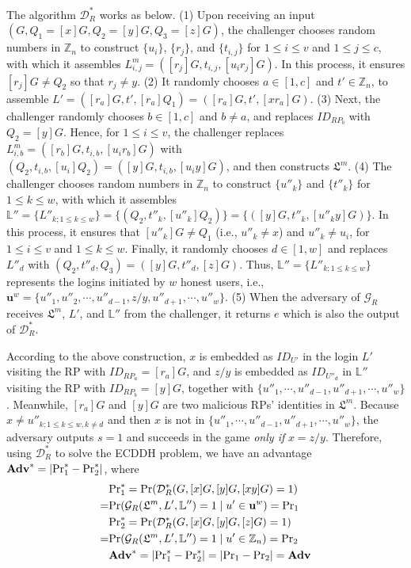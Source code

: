 The algorithm $\mathcal{D}^*_R$ works as below. (1) Upon receiving an input $(G, Q_1=[x]G, Q_2=[y]G, Q_3=[z]G)$,
the challenger
chooses random numbers in $\mathbb{Z}_n$ to construct $\{u_i\}$, $\{r_j\}$, and $\{t_{i, j}\}$ for $1 \le i \le v$ and $1 \le j \le c$, with which it assembles $L^m_{i, j}=([r_j]G, t_{i,j}, [u_ir_j]G)$.
In this process, it ensures $[r_{j}]G \neq Q_2$ so that $r_j \neq y$.
(2) It randomly chooses $a \in [1, c]$ and $t' \in \mathbb{Z}_n$, to assemble $L' = ([r_{a}]G, t', [r_{a}]Q_1) = ([r_{a}]G, t', [xr_{a}]G)$.
(3)
Next, the challenger randomly chooses $b \in [1, c]$ and $b \neq a$, and replaces $ID_{RP_b}$ with $Q_2 = [y]G$.
Hence, for $1 \le i \le v$, the challenger replaces $L^m_{i, b}=([r_b]G, t_{i,b}, [u_ir_b]G)$ with $(Q_2, t_{i,b}, [u_i]Q_2) = ([y]G, t_{i,b}, [u_iy]G)$, and then constructs $\mathfrak{L}^m$.
(4) The challenger chooses random numbers in $\mathbb{Z}_n$ to construct $\{u''_k\}$ and $\{t''_k\}$ for $1 \leq k \leq w$,
 with which it assembles $\mathbb{L}'' = \{L''_{k; 1\leq k \leq w}\} = \{(Q_2, t''_k, [u''_k]Q_2)\} = \{([y]G, t''_k, [u''_ky]G)\}$.
In this process, it ensures that $[u''_k]G \neq Q_1$ (i.e., $u''_k \neq x$) and $u''_k \neq u_i$,
 for $1 \le i \le v$ and $1 \le k \le w$.
Finally, it randomly chooses $d \in [1, w]$ and replaces $L''_{d}$ with $(Q_2, t''_d, Q_3) = ([y]G, t''_d, [z]G)$.
 Thus, $\mathbb{L}'' = \{L''_{k;1\leq k \leq w}\}$ represents the logins initiated by $w$ honest users, i.e., $\mathbf{u}^w=\{u''_1, u''_2, \cdots, u''_{d-1}, z/y, u''_{d+1}, \cdots, u''_w\}$.
 (5) When the adversary of $\mathcal{G}_R$ receives $\mathfrak{L}^m$, $L'$, and $\mathbb{L}''$ from the challenger, it returns $e$ which is also the output of $\mathcal{D}^*_R$.

According to the above construction, %
$x$ is embedded as $ID_{U'}$ in the login $L'$ visiting the RP with $ID_{RP_{a}} = [r_{a}]G$,
and $z/y$ is embedded as $ID_{U''_d}$ in $\mathbb{L}''$ visiting the RP with $ID_{RP_{b}}=[y]G$,
together with $\{u''_1, \cdots, u''_{d-1}, u''_{d+1}, \cdots, u''_w\}$.
Meanwhile, $[r_{a}]G$ and $[y]G$ are two malicious RPs' identities in $\mathfrak{L}^m$.
Because $x \neq u''_{k; 1\leq k \leq w, k \neq d}$ and then $x$ is not in $\{u''_1, \cdots, u''_{d-1}, u''_{d+1}, \cdots, u''_w\}$, the adversary outputs $s=1$ and succeeds in the game \emph{only if} $x = z/y$.
Therefore, using $\mathcal{D}^*_R$ to solve the ECDDH problem, we have an advantage $\mathbf{Adv}^*=|{\rm Pr}^*_1 - {\rm Pr}^*_2|$, where
\begin{align*}
&{\rm Pr}^*_1 =  {\rm Pr}(\mathcal{D}^*_R(G, [x]G, [y]G, [xy]G)=1) \\
=&{\rm Pr}(\mathcal{G}_R(\mathfrak{L}^m, L', \mathbb{L}'')=1 \; | \; u' \in \mathbf{u}^w) = {\rm Pr}_1 \\
&{\rm Pr}^*_2= {\rm Pr}(\mathcal{D}^*_R(G, [x]G, [y]G, [z]G)=1) \\
=&{\rm Pr}(\mathcal{G}_R(\mathfrak{L}^m, L', \mathbb{L}'')=1 \; | \; u' \in \mathbb{Z}_n) = {\rm Pr}_2 \\
&\mathbf{Adv}^*=|{\rm Pr}^*_1-{\rm Pr}^*_2|=|{\rm Pr}_1-{\rm Pr}_2|={\mathbf{Adv}}
\end{align*}

